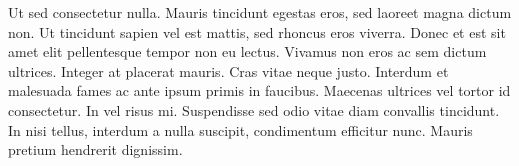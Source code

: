Ut sed consectetur nulla. Mauris tincidunt egestas
eros, sed laoreet magna dictum non. Ut tincidunt
sapien vel est mattis, sed rhoncus eros viverra.
Donec et est sit amet elit pellentesque tempor non
eu lectus. Vivamus non eros ac sem dictum ultrices.
Integer at placerat mauris. Cras vitae neque justo.
Interdum et malesuada fames ac ante ipsum primis in
faucibus. Maecenas ultrices vel tortor id
consectetur. In vel risus mi. Suspendisse sed odio
vitae diam convallis tincidunt. In nisi tellus,
interdum a nulla suscipit, condimentum efficitur
nunc. Mauris pretium hendrerit dignissim.


